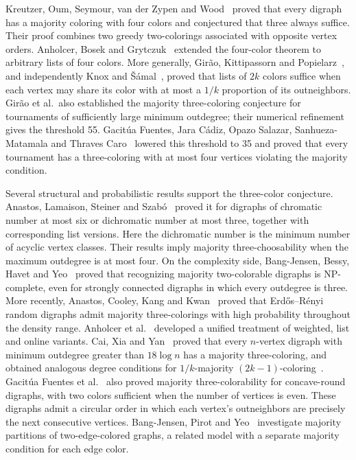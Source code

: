\documentclass[12pt]{article}
\begin{document}
Kreutzer, Oum, Seymour, van der Zypen and Wood~\cite{KOSZW} proved that every digraph has a majority coloring with four colors and conjectured that three always suffice. Their proof combines two greedy two-colorings associated with opposite vertex orders. Anholcer, Bosek and Grytczuk~\cite{ABG} extended the four-color theorem to arbitrary lists of four colors. More generally, Gir\~ao, Kittipassorn and Popielarz~\cite{GKP}, and independently Knox and \v{S}\'amal~\cite{KS}, proved that lists of \(2k\) colors suffice when each vertex may share its color with at most a \(1/k\) proportion of its outneighbors. Gir\~ao et al.\ also established the majority three-coloring conjecture for tournaments of sufficiently large minimum outdegree; their numerical refinement gives the threshold 55. Gacit\'ua Fuentes, Jara C\'adiz, Opazo Salazar, Sanhueza-Matamala and Thraves Caro~\cite[Theorems~1.7--1.8]{GJOST} lowered this threshold to 35 and proved that every tournament has a three-coloring with at most four vertices violating the majority condition.

Several structural and probabilistic results support the three-color conjecture. Anastos, Lamaison, Steiner and Szab\'o~\cite{ALSS} proved it for digraphs of chromatic number at most six or dichromatic number at most three, together with corresponding list versions. Here the dichromatic number is the minimum number of acyclic vertex classes. Their results imply majority three-choosability when the maximum outdegree is at most four. On the complexity side, Bang-Jensen, Bessy, Havet and Yeo~\cite{BBHY} proved that recognizing majority two-colorable digraphs is NP-complete, even for strongly connected digraphs in which every outdegree is three. More recently, Anastos, Cooley, Kang and Kwan~\cite{ACKK} proved that Erd\H{o}s--R\'enyi random digraphs admit majority three-colorings with high probability throughout the density range. Anholcer et al.~\cite{MrsCorrect} developed a unified treatment of weighted, list and online variants. Cai, Xia and Yan~\cite[Theorem~3.1]{CXY} proved that every \(n\)-vertex digraph with minimum outdegree greater than \(18\log n\) has a majority three-coloring, and obtained analogous degree conditions for \(1/k\)-majority \((2k-1)\)-coloring~\cite[Theorem~3.2]{CXY}. Gacit\'ua Fuentes et al.~\cite[Theorems~2.1--2.2]{GJOST} also proved majority three-colorability for concave-round digraphs, with two colors sufficient when the number of vertices is even. These digraphs admit a circular order in which each vertex's outneighbors are precisely the next consecutive vertices. Bang-Jensen, Pirot and Yeo~\cite{BPY} investigate majority partitions of two-edge-colored graphs, a related model with a separate majority condition for each edge color.
\end{document}
